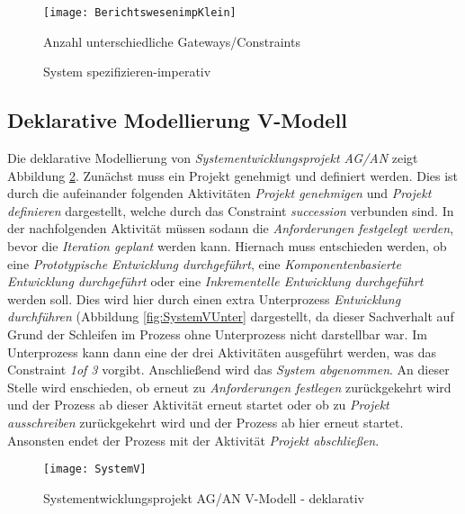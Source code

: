 \begin{figure}[!htbp]
\begin{center}
  \texttt{[image: BerichtswesenimpKlein]} %
  \caption{System spezifizieren-imperativ}
  \label{fig:BerichtswesenimpKlein}Anzahl unterschiedliche Gateways/Constraints\end{center}
\end{figure}

\clearpage
\subsection{Deklarative Modellierung V-Modell}


Die deklarative Modellierung von \textit{Systementwicklungsprojekt AG/AN}  zeigt Abbildung \ref{fig:SystemV}. \newline
Zunächst muss ein Projekt genehmigt und definiert werden. Dies ist durch die aufeinander folgenden Aktivitäten \textit{Projekt genehmigen} und \textit{Projekt definieren} dargestellt, welche durch das Constraint \textit{succession} verbunden sind.\newline
In der nachfolgenden Aktivität müssen sodann die \textit{Anforderungen festgelegt werden}, bevor die \textit{Iteration geplant} werden kann. \newline
Hiernach muss entschieden werden, ob eine \textit{Prototypische Entwicklung durchgeführt}, eine \textit{Komponentenbasierte Entwicklung durchgeführt} oder eine \textit{Inkrementelle Entwicklung durchgeführt} werden soll. Dies wird hier durch einen extra Unterprozess \textit{Entwicklung durchführen} (Abbildung \ref{fig:SystemVUnter} dargestellt, da dieser Sachverhalt auf Grund der Schleifen im Prozess ohne Unterprozess nicht darstellbar war. Im Unterprozess kann dann eine der drei Aktivitäten ausgeführt werden, was das Constraint \textit{1of 3} vorgibt.\newline
Anschließend wird das \textit{System abgenommen}.\newline
An dieser Stelle wird enschieden, ob erneut zu \textit{Anforderungen festlegen} zurückgekehrt wird und der Prozess ab dieser Aktivität erneut startet oder ob zu \textit{Projekt ausschreiben} zurückgekehrt wird und der Prozess ab hier erneut startet. Ansonsten endet der Prozess mit der Aktivität \textit{Projekt abschließen}.

\begin{figure}[!htbp]
\begin{center}
  \texttt{[image: SystemV]} %
  \caption{Systementwicklungsprojekt AG/AN  V-Modell - deklarativ}
  \label{fig:SystemV}
\end{center}
\end{figure}


